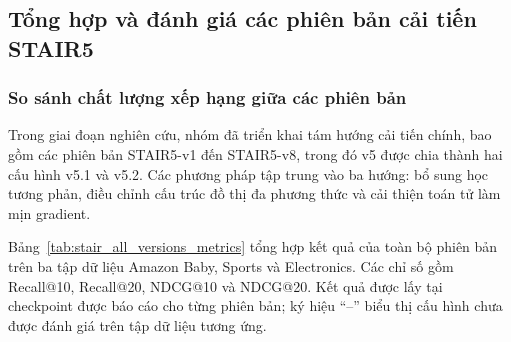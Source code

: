 \subsection{Tổng hợp và đánh giá các phiên bản cải tiến STAIR5}

\subsubsection{So sánh chất lượng xếp hạng giữa các phiên bản}

Trong giai đoạn nghiên cứu, nhóm đã triển khai tám hướng cải tiến chính, bao gồm các phiên bản STAIR5-v1 đến STAIR5-v8, trong đó v5 được chia thành hai cấu hình v5.1 và v5.2. Các phương pháp tập trung vào ba hướng: bổ sung học tương phản, điều chỉnh cấu trúc đồ thị đa phương thức và cải thiện toán tử làm mịn gradient.

Bảng~\ref{tab:stair_all_versions_metrics} tổng hợp kết quả của toàn bộ phiên bản trên ba tập dữ liệu Amazon Baby, Sports và Electronics. Các chỉ số gồm Recall@10, Recall@20, NDCG@10 và NDCG@20. Kết quả được lấy tại checkpoint được báo cáo cho từng phiên bản; ký hiệu ``--'' biểu thị cấu hình chưa được đánh giá trên tập dữ liệu tương ứng.


\begingroup
\footnotesize
\renewcommand{\arraystretch}{1.14}
\setlength{\tabcolsep}{4pt}
\setlength{\LTleft}{\fill}
\setlength{\LTright}{\fill}

\begingroup
\footnotesize
\renewcommand{\arraystretch}{1.12}
\setlength{\tabcolsep}{3.5pt}
\setlength{\LTleft}{\fill}
\setlength{\LTright}{\fill}
\setlength{\LTpre}{6pt}
\setlength{\LTpost}{6pt}

